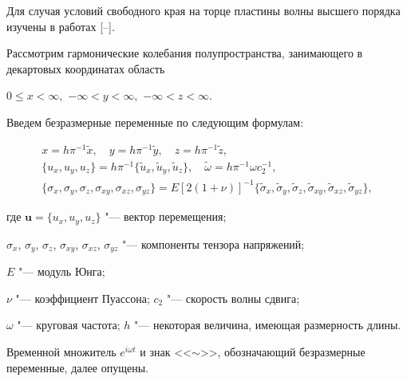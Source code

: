 Для случая условий свободного края на торце пластины волны высшего порядка изучены в работах [--].



\smallskip




Рассмотрим гармонические колебания полупространства, занимающего в декартовых координатах область 

$0\leqslant x<\infty,$ $-\infty<y<\infty,$ $-\infty<z<\infty$. 

Введем безразмерные переменные по следующим формулам:

\begin{equation}

\label{1.1}

\begin{array}{c}

x=h \pi^{-1} \widetilde{x}, \quad  

y=h \pi^{-1} \widetilde{y}, \quad  

z=h \pi^{-1} \widetilde{z}, \\ 

\{u_x,u_y,u_z\}= h\pi^{-1}\{ \widetilde{u}_x, \widetilde{u}_y,\widetilde{u}_z\}, \quad  \widetilde{\omega}=h \pi^{-1}\omega c_2^{-1}, \\

 \{\sigma_x,\sigma_y,\sigma_z,\sigma_{xy},\sigma_{xz},\sigma_{yz}\}= E[2(1+\nu)]^{-1} \{\widetilde{\sigma}_x,\widetilde{\sigma}_y,\widetilde{\sigma}_z,\widetilde{\sigma}_{xy},\widetilde{\sigma}_{xz},\widetilde{\sigma}_{yz}\}, 

\end{array}

\end{equation}

где $\boldsymbol{u}=\{u_x, u_y, u_z\}$ "--- вектор перемещения; 

$\sigma_x$, $\sigma_y$, $\sigma_z$, $\sigma_{xy}$, $\sigma_{xz}$, $\sigma_{yz}$ "--- компоненты тензора напряжений; 

$E$ "--- модуль Юнга; 

$\nu$ "--- коэффициент Пуассона; $c_2$ "--- скорость волны сдвига; 

$\omega$ "--- круговая частота; $h$ "--- некоторая величина, имеющая размерность длины. 

Временной множитель $e^{i\omega t}$ и знак <<$\sim$>>, обозначающий безразмерные переменные, далее опущены. 


